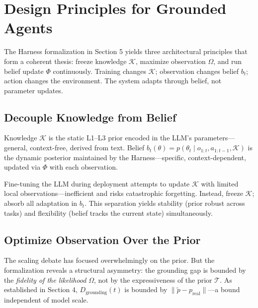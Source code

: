 \section{Design Principles for Grounded Agents}

The Harness formalization in Section 5 yields three architectural principles that form a coherent thesis: freeze knowledge $\mathcal{K}$, maximize observation $\Omega$, and run belief update $\Phi$ continuously. Training changes $\mathcal{K}$; observation changes belief $b_t$; action changes the environment. The system adapts through belief, not parameter updates.

\subsection{Decouple Knowledge from Belief}

Knowledge $\mathcal{K}$ is the static L1--L3 prior encoded in the LLM's parameters---general, context-free, derived from text. Belief $b_t(\theta) = p(\theta_t \mid o_{1:t}, a_{1:t-1}, \mathcal{K})$ is the dynamic posterior maintained by the Harness---specific, context-dependent, updated via $\Phi$ with each observation.

Fine-tuning the LLM during deployment attempts to update $\mathcal{K}$ with limited local observations---inefficient and risks catastrophic forgetting. Instead, freeze $\mathcal{K}$; absorb all adaptation in $b_t$. This separation yields stability (prior robust across tasks) and flexibility (belief tracks the current state) simultaneously.

\subsection{Optimize Observation Over the Prior}

The scaling debate has focused overwhelmingly on the prior. But the formalization reveals a structural asymmetry: the grounding gap is bounded by the \emph{fidelity of the likelihood} $\Omega$, not by the expressiveness of the prior $\mathcal{T}$. As established in Section 4, $D_{\text{grounding}}(t)$ is bounded by $\|\tilde{p} - p_{\text{real}}\|$---a bound independent of model scale.

